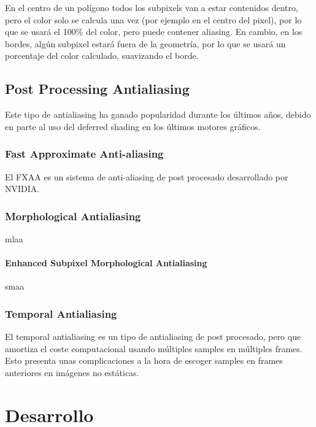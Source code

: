 \documentclass[withindex, glossary]{cam-thesis}
\begin{document}
En el centro de un polígono todos los subpixels van a estar contenidos dentro, pero el color solo se calcula una vez (por ejemplo en el centro del pixel), por lo que se usará el 100\% del color, pero puede contener aliasing. En cambio, en los bordes, algún subpixel estará fuera de la geometría, por lo que se usará un porcentaje del color calculado, suavizando el borde.

\section{Post Processing Antialiasing}

Este tipo de antialiasing ha ganado popularidad durante los últimos años, debido en parte al uso del deferred shading en los últimos motores gráficos.

\subsection{Fast Approximate Anti-aliasing}

El FXAA\cite{FXAA} es un sistema de anti-aliasing de post procesado desarrollado por NVIDIA.

\subsection{Morphological Antialiasing}
mlaa

\subsubsection{Enhanced Subpixel Morphological Antialiasing}
smaa

\subsection{Temporal Antialiasing}

El temporal antialiasing es un tipo de antialiasing de post procesado, pero que amortiza el coste computacional usando múltiples samples en múltiples frames. Esto presenta unas complicaciones a la hora de escoger samples en frames anteriores en imágenes no estáticas.

\chapter{Desarrollo}
\end{document}
